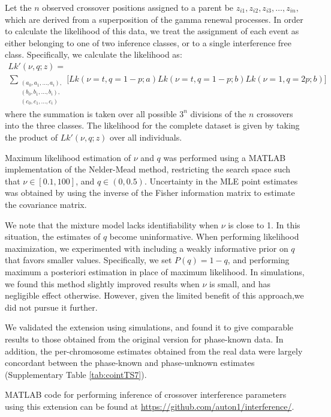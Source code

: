 Let the $n$ observed crossover positions assigned to a parent be $z_{i1},z_{i2},z_{i3},\dots,z_{in},$ 
which are derived from a superposition of the gamma renewal processes. In order to calculate the 
likelihood of this data, we treat the assignment of each event as either belonging to one of 
two inference classes, or to a single interference free class. Specifically, we calculate the likelihood as:  
\begin{multline}
    Lk'(\nu,q;z) = \\
    \sum_{\substack{ (a_0,a_1,\dots,a_i), \\
                     (b_0,b_1,\dots,b_i), \\
                     (c_0,c_1,\dots,c_i)
             }}
    \Big[ Lk(\nu=t,q=1-p;a) Lk(\nu=t,q=1-p;b) Lk(\nu=1,q=2p;b) \Big]
\end{multline}
where the summation is taken over all possible $3^n$ divisions of the $n$ crossovers into  
the three classes. The likelihood for the complete dataset is given by taking the  
product of $Lk'(\nu,q;z)$ over all individuals. 

Maximum likelihood estimation of $\nu$ and $q$ was performed using a MATLAB  
implementation of the Nelder-Mead method\cite{DErrico}, restricting the search space such  
that $\nu \in [0.1,100]$, and $q \in (0,0.5)$. Uncertainty in the MLE point estimates was  
obtained by using the inverse of the Fisher information matrix to estimate the  
covariance matrix.  
 
We note that the mixture model lacks identifiability when $\nu$ is close to 1. 
In this situation, the estimates of $q$  become uninformative. When performing likelihood 
maximization, we experimented with including a weakly informative prior on $q$  that favors 
smaller values. Specifically, we set $P(q)= 1 - q$, and performing maximum a posteriori 
estimation in place of maximum likelihood. In simulations, we found this method slightly 
improved results when $\nu$ is small, and has negligible effect otherwise. However, given 
the limited benefit of this approach,we did not pursue it further.  

We validated the extension using simulations, and found it to give comparable results to 
those obtained from the original version for phase-known data. In addition, the per-chromosome 
estimates obtained from the real data were largely concordant between the phase-known and 
phase-unknown estimates (Supplementary Table \ref{tab:cointTS7}).  

MATLAB code for performing inference of crossover interference parameters using this 
extension can be found at \url{https://github.com/auton1/interference/}.

